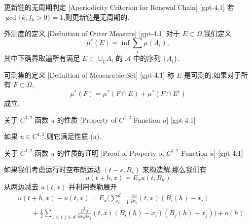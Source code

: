 \documentclass[UTF8]{ctexart}
\begin{document}
    
    
    \begin{ppt}
        {更新链的无周期判定}
        [Aperiodicity Criterion for Renewal Chain]
        [gpt-4.1]
        若 $\gcd \{ k : f_{k} > 0 \} = 1$,则更新链是无周期的.
    \end{ppt}
    
    
    
    \begin{dfn}
        {外测度的定义}
        [Definition of Outer Measure]
        [gpt-4.1]
        对于 $E \subset \Omega$,我们定义
\[
\mu^*(E) = \inf \sum_{i} \mu(A_{i}),
\]
其中下确界取遍所有满足 $E \subset \cup_{i} A_{i}$ 的 $\mathcal{A}$ 中的序列 $\{A_i\}$.
    \end{dfn}
    
    
    
    \begin{dfn}
        {可测集的定义}
        [Definition of Measurable Set]
        [gpt-4.1]
        称 $E$ 是可测的,如果对于所有 $F \subset \Omega$,
\[
\mu^*(F) = \mu^*(F \cap E) + \mu^*(F \cap E^{c})
\]
成立.
    \end{dfn}
    
    
    
    \begin{thm}
        {关于 $C^{1,2}$ 函数 $
    u$ 的性质}
        [Property of $C^{1,2}$ Function $
    u$]
        [gpt-4.1]
        
如果 $
u \in C^{1,2}$,则它满足性质 (a).

    \end{thm}
    
    
    
    \begin{prf}
        {关于 $C^{1,2}$ 函数 $
    u$ 的性质的证明}
        [Proof of Property of $C^{1,2}$ Function $
    u$]
        [gpt-4.1]
        
如果我们考虑运行时空布朗运动 $(t - s, B_s)$ 来构造解,那么我们有
\[
u(t + h, x) = E_x 
u(t, B_h)
\]
从两边减去 $
u(t, x)$ 并利用泰勒展开
\[
\begin{array}{rl}
& 
u(t + h, x) - 
u(t, x) = E_x \Bigg( \displaystyle \sum_{i = 1}^{d} \frac{\partial 
u}{\partial x_i}(t, x) (B_i(h) - x_i) \\
& \qquad + \displaystyle \frac{1}{2} \sum_{1 \leq i, j \leq d} \frac{\partial^2 
u}{\partial x_i \partial x_j}(t, x) (B_i(h) - x_i) (B_j(h) - x_j) \Bigg) + o(h)
\end{array}
\]

    \end{prf}
    
\end{document}
